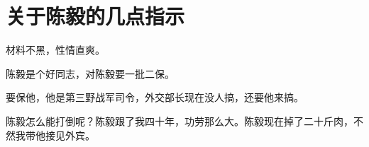 \section[关于陈毅的几点指示（一九六七年八月十一日）]{关于陈毅的几点指示}


材料不黑，性情直爽。


陈毅是个好同志，对陈毅要一批二保。


要保他，他是第三野战军司令，外交部长现在没人搞，还要他来搞。


陈毅怎么能打倒呢？陈毅跟了我四十年，功劳那么大。陈毅现在掉了二十斤肉，不然我带他接见外宾。

